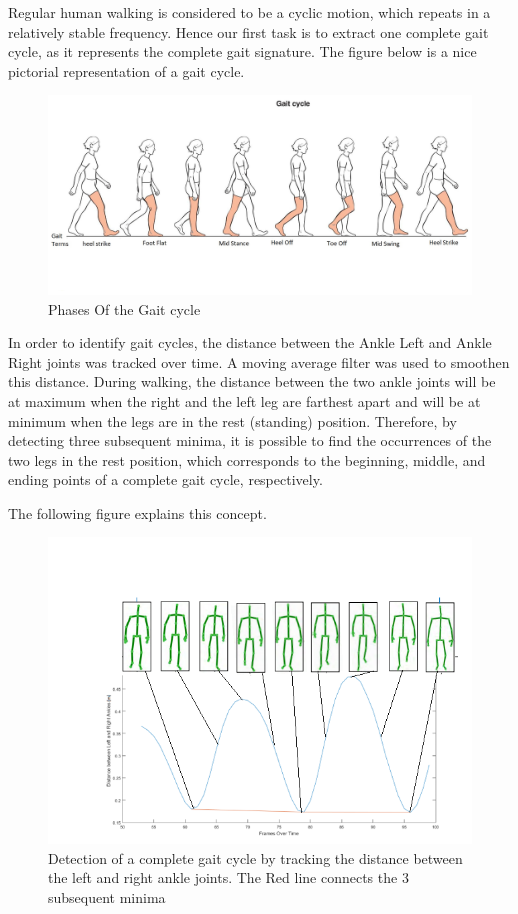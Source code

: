 \noindent Regular human walking is considered to be a cyclic motion, which repeats in a relatively stable frequency. Hence our first task is to extract one complete gait cycle, as it represents the complete gait signature. The figure below is a nice pictorial representation of a gait cycle.\\

\begin{figure}[h]
\centering
\includegraphics[scale=0.3]{gaitoriginal.jpg}
\caption{Phases Of the Gait cycle}
\end{figure}
 
\noindent In order to identify gait cycles, the distance between the Ankle Left and Ankle Right joints was tracked over time. A moving average filter was used to smoothen this distance. During walking, the distance between the two ankle joints will be at maximum when the right and the left leg are farthest apart and will be at minimum when the legs are in the rest (standing) position. Therefore, by detecting three subsequent minima, it is possible to find the occurrences of the two legs in the rest position, which corresponds to the beginning, middle, and ending points of a complete gait cycle, respectively.                                         

\noindent The following figure explains this concept.
\clearpage
\begin{figure}[h]
\centering
\includegraphics[scale=0.8]{wave.png}
\caption{Detection of a complete gait cycle by tracking the distance between the left and right ankle joints.
The Red line connects the 3 subsequent minima
}
\end{figure}

